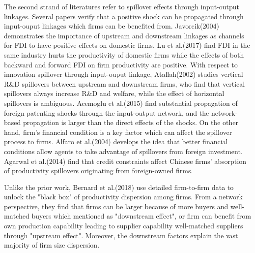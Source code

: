 \documentclass[12pt]{article}%
\begin{document}
\begin{CJK*}{GBK}{fs}
The second strand of literatures refer to spillover effects through input-output linkages. Several papers verify that a positive shock can be propagated through input-ouput linkages which firms can be benefited from. \textcolor[rgb]{0.00,0.07,1.00}{Javorcik(2004)} demonstrates the importance of upstream and downstream linkages as channels for FDI to have positive effects on domestic firms. \textcolor[rgb]{0.00,0.07,1.00}{Lu et al.(2017)} find FDI in the same industry hurts the productivity of domestic firms while the effects of both backward and forward FDI on firm productivity are positive. With respect to innovation spillover through input-ouput linkage, \textcolor[rgb]{0.00,0.07,1.00}{ Atallah(2002)} studies vertical R\&D spillovers between upstream and downstream firms, who find that vertical spillovers always increase R\&D and welfare, while the effect of horizontal spillovers is ambiguous. \textcolor[rgb]{0.00,0.07,1.00}{Acemoglu et al.(2015)} find substantial propagation of foreign patenting shocks through the input-output network, and the network-based propagation is larger than the direct effects of the shocks. On the other hand, firm's financial condition is a key factor which can affect the spillover process to firms. \textcolor[rgb]{0.00,0.07,1.00}{Alfaro et al.(2004)} develops the idea that better financial conditions allow agents to take advantage of spillovers from foreign investment. \textcolor[rgb]{0.00,0.07,1.00}{Agarwal et al.(2014)} find that credit constraints affect Chinese firms' absorption of productivity spillovers originating from foreign-owned firms. \par
Unlike the prior work, \textcolor[rgb]{0.00,0.07,1.00}{Bernard et al.(2018)} use detailed firm-to-firm data to unlock the "black box" of productivity dispersion among firms. From a network perspective, they find that firms can be larger because of more buyers and well-matched buyers which mentioned as "downstream effect", or firm can benefit from own production capability leading to supplier capability well-matched suppliers through "upstream effect". Moreover, the downstream factors explain the vast majority of firm size dispersion. \par

\end{CJK*}
\end{document}
